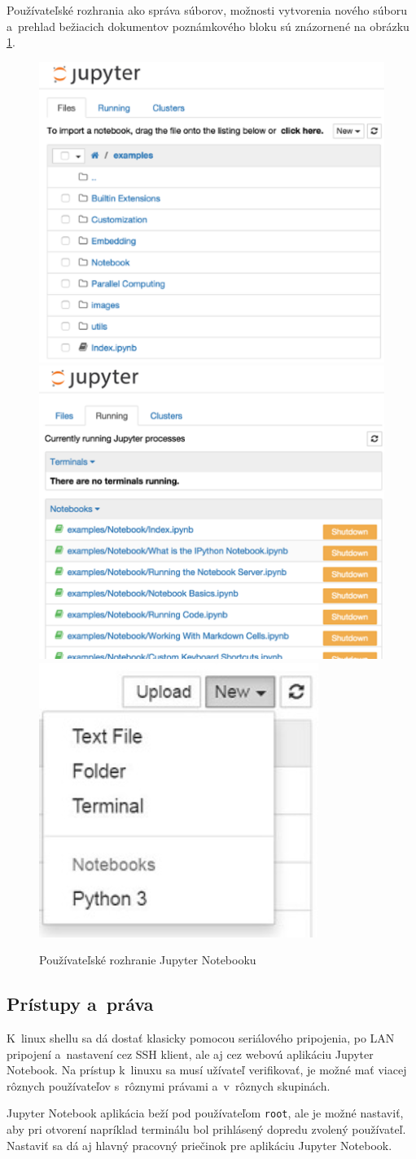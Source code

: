 Používateľské rozhrania ako správa súborov, možnosti vytvorenia nového súboru a~prehlad bežiacich dokumentov poznámkového bloku sú znázornené na obrázku \ref{jupyter}.~\cite{pynqDoc}


\begin{figure}[b] \label{jupyter}
    \centering
    \includegraphics[width=0.35\linewidth]{obrazky-figures/firefox_cb7riywHcl.png}
    \includegraphics[width=0.35\linewidth]{obrazky-figures/firefox_9oJYQhp7gx.png}
    \includegraphics[width=0.2\linewidth]{obrazky-figures/firefox_n4h9S12Nm1.png}
    \caption{Používateľské rozhranie Jupyter Notebooku~\cite{pynqDoc}}
\end{figure}


\subsection{Prístupy a~práva}
K~linux shellu sa dá dostať klasicky pomocou seriálového pripojenia, po LAN pripojení a~nastavení cez SSH klient, ale aj cez webovú aplikáciu Jupyter Notebook. Na prístup k~linuxu sa musí užívateľ verifikovať, je možné mať viacej rôznych používateľov s~rôznymi právami a~v~rôznych skupinách.

Jupyter Notebook aplikácia beží pod používateľom \verb|root|, ale je možné nastaviť, aby pri otvorení napríklad terminálu bol prihlásený dopredu zvolený používateľ. Nastaviť sa dá aj hlavný pracovný priečinok pre aplikáciu Jupyter Notebook.~\cite{pynqDoc}


